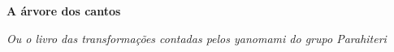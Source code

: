 


\begingroup\thispagestyle{empty}\vspace*{.05\textheight} 

              \formular
              \Huge
              \noindent
              \textbf{A árvore dos cantos}
              
              \vspace{0.3em}

              \noindent\large\textit{Ou o livro das transformações contadas pelos yanomami do grupo Parahiteri}
                    
\endgroup
\vfill
\pagebreak